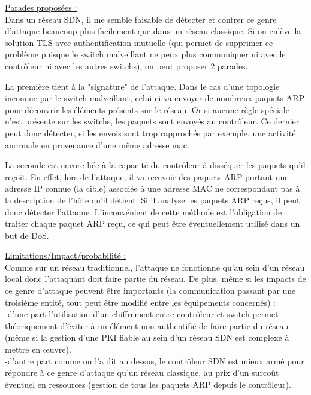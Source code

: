 \underline{Parades proposées :}\\
Dans un réseau SDN, il me semble faisable de détecter et contrer ce genre d'attaque beaucoup plus facilement que dans un réseau classique. Si on enlève la solution TLS avec authentification mutuelle (qui permet de supprimer ce problème puisque le switch malveillant ne peux plus communiquer ni avec le contrôleur ni avec les autres switchs), on peut proposer 2 parades.

La première tient à la "signature" de l'attaque. Dans le cas d'une topologie inconnue par le switch malveillant, celui-ci va envoyer de nombreux paquets ARP pour découvrir les éléments présents sur le réseau. Or si aucune règle spéciale n'est présente sur les switchs, les paquets sont envoyés au contrôleur. Ce dernier peut donc détecter, si les envois sont trop rapprochés par exemple, une activité anormale en provenance d'une même adresse mac.

La seconde est encore liée à la capacité du contrôleur à disséquer les paquets qu'il reçoit. En effet, lors de l'attaque, il va recevoir des paquets ARP portant une adresse IP connue (la cible) associée à une adresse MAC ne correspondant pas à la description de l'hôte qu'il détient. Si il analyse les paquets ARP reçus, il peut donc détecter l'attaque. L'inconvénient de cette méthode est l'obligation de traiter chaque paquet ARP reçu, ce qui peut être éventuellement utilisé dans un but de DoS.

\underline{Limitations/Impact/probabilité :}\\
Comme sur un réseau traditionnel, l’attaque ne fonctionne qu’au sein d’un réseau local donc l’attaquant doit faire partie du réseau. De plus, même si les impacts de ce genre d’attaque peuvent être importants (la communication passant par une troisième entité, tout peut être modifié entre les équipements concernés) :\\
-d’une part l’utilisation d’un chiffrement entre contrôleur et switch permet théoriquement d’éviter à un élément non authentifié de faire partie du réseau (même si la gestion d’une PKI fiable au sein d’un réseau SDN est complexe à mettre en œuvre).\\
-d’autre part comme on l'a dit au dessus, le contrôleur SDN est mieux armé pour répondre à ce genre d’attaque qu’un réseau classique, au prix d'un surcoût éventuel en ressources (gestion de tous les paquets ARP depuis le contrôleur).